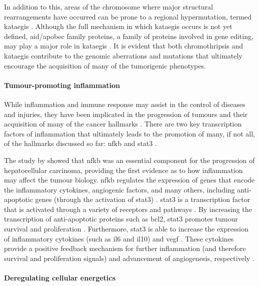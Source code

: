 In addition to this, areas of the chromosome where major structural rearrangements have occurred can be prone to a regional hypermutation, termed \gls{kataegis} \citep{Leibowitz2015,Nik-Zainal2012}.
Although the full mechanism in which \gls{kataegis} occurs is not yet defined, \gls{aid}/\acrshort{apobec} family proteins, a family of proteins involved in gene editing, may play a major role in \gls{kataegis} \citep{Leibowitz2015,Nik-Zainal2012}.
It is evident that both \gls{chromothripsis} and \gls{kataegis} contribute to the genomic aberrations and mutations that ultimately encourage the acquisition of many of the tumorigenic phenotypes.

\paragraph{Tumour-promoting inflammation}

\noindent
While inflammation and immune response may assist in the control of diseases and injuries, they have been implicated in the progression of tumours and their acquisition of many of the cancer hallmarks \citep{Hanahan2011}.
There are two key transcription factors of inflammation that ultimately leads to the promotion  of many, if not all, of the hallmarks discussed so far: \gls{nfkb} and \gls{stat3} \citep{Mantovani2008}.

The study by \citet{Pikarsky2004} showed that \gls{nfkb} was an essential component for the progression of hepatocellular carcinoma, providing the first evidence as to how inflammation may affect the tumour biology.
\gls{nfkb} regulates the expression of genes that encode the inflammatory cytokines, angiogenic factors, and many others, including anti-apoptotic genes (through the activation of \gls{stat3}) \citep{Elinav2013,Mantovani2008}.
\gls{stat3} is a transcription factor that is activated through a variety of receptors and pathways \citep{Yu2007,Yu2014}.
By increasing the transcription of anti-apoptotic proteins such as \gls{bcl2}, \gls{stat3} promotes tumour survival and proliferation \citep{Yu2007}.
Furthermore, \gls{stat3} is able to increase the expression of inflammatory cytokines (such as \gls{il6} and \acrshort{il10}) and \acrshort{vegf} \citep{Yu2007}.
These cytokines provide a positive feedback mechanism for further inflammation (and therefore survival and proliferation signals) and advancement of angiogenesis, respectively \citep{Yu2007}.

\paragraph{Deregulating cellular energetics}

